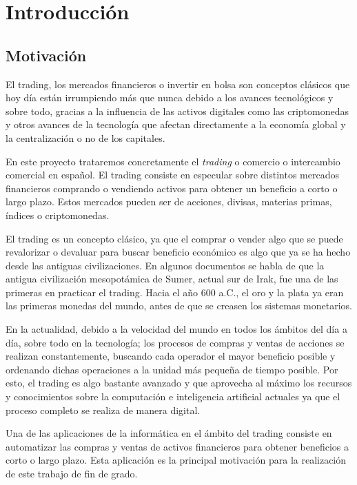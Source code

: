 
\chapter{Introducción} \label{introduccion}

\section{Motivación}

El trading, los mercados financieros o invertir en bolsa son conceptos clásicos que hoy día están irrumpiendo más que nunca debido a los avances tecnológicos y sobre todo, gracias a la influencia de las activos digitales como las criptomonedas y otros avances de la tecnología que afectan directamente a la economía global y la centralización o no de los capitales. \newline

En este proyecto trataremos concretamente el \textit{trading} o comercio o intercambio comercial en español. El trading consiste en especular sobre distintos mercados financieros comprando o vendiendo activos para obtener un beneficio a corto o largo plazo. Estos mercados pueden ser de acciones, divisas, materias primas, índices o criptomonedas. \newline

El trading es un concepto clásico, ya que el comprar o vender algo que se puede revalorizar o devaluar para buscar beneficio económico es algo que ya se ha hecho desde las antiguas civilizaciones. En algunos documentos se habla de que la antigua civilización mesopotámica de Sumer, actual sur de Irak, fue una de las primeras en practicar el trading. Hacia el año 600 a.C., el oro y la plata ya eran las primeras monedas del mundo, antes de que se creasen los sistemas monetarios. \newline

En la actualidad, debido a la velocidad del mundo en todos los ámbitos del día a día, sobre todo en la tecnología; los procesos de compras y ventas de acciones se realizan constantemente, buscando cada operador el mayor beneficio posible y ordenando dichas operaciones a la unidad más pequeña de tiempo posible. Por esto, el trading es algo bastante avanzado y que aprovecha al máximo los recursos y conocimientos sobre la computación e inteligencia artificial actuales ya que el proceso completo se realiza de manera digital. \newline

Una de las aplicaciones de la informática en el ámbito del trading consiste en automatizar las compras y ventas de activos financieros para obtener beneficios a corto o largo plazo. Esta aplicación es la principal motivación para la realización de este trabajo de fin de grado. \newline

